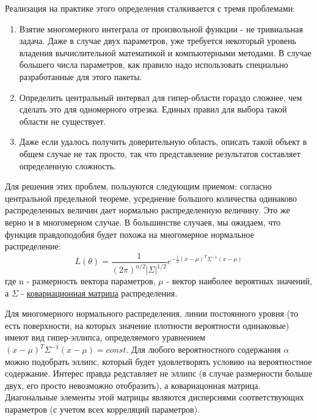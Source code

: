 Реализация на практике этого определения сталкивается с тремя
проблемами:

\begin{enumerate}
\item Взятие многомерного интеграла от произвольной функции - не тривиальная
  задача. Даже в случае двух параметров, уже требуется некоторый уровень
  владения вычислительной математикой и компьютерными методами. В случае
  большего числа параметров, как правило надо использовать специально
  разработанные для этого пакеты.
\item Определить центральный интервал для гипер-области гораздо сложнее, чем
  сделать это для одномерного отрезка. Единых правил для выбора такой
  области не существует.
\item Даже если удалось получить доверительную область, описать такой объект
  в общем случае не так просто, так что представление результатов
  составляет определенную сложность.
\end{enumerate}

Для решения этих проблем, пользуются следующим приемом: согласно
центральной предельной теореме, усреднение большого количества одинаково
распределенных величин дает нормально распределенную величину. Это же
верно и в многомерном случае. В большинстве случаев, мы ожидаем, что
функция правдоподобия будет похожа на многомерное нормальное
распределение: \begin{equation}
    L(\theta) = \frac{1}{(2 \pi)^{n/2}\left|\Sigma\right|^{1/2}} e^{-\frac{1}{2} (x - \mu)^T \Sigma^{-1} (x - \mu)}
\end{equation} где n - размерность вектора параметров, $\mu$ - вектор
наиболее вероятных значений, а $\Sigma$ -
\href{https://ru.wikipedia.org/wiki/\%D0\%9A\%D0\%BE\%D0\%B2\%D0\%B0\%D1\%80\%D0\%B8\%D0\%B0\%D1\%86\%D0\%B8\%D0\%BE\%D0\%BD\%D0\%BD\%D0\%B0\%D1\%8F_\%D0\%BC\%D0\%B0\%D1\%82\%D1\%80\%D0\%B8\%D1\%86\%D0\%B0}{ковариационная
матрица} распределения.

Для многомерного нормального распределения, линии постоянного уровня (то
есть поверхности, на которых значение плотности вероятности одинаковые)
имеют вид гипер-эллипса, определяемого уравнением
$(x - \mu)^T \Sigma^{-1} (x - \mu) = const$. Для любого вероятностного
содержания $\alpha$ можно подобрать эллипс, который будет
удовлетворять условию на вероятностное содержание. Интерес правда
редставляет не эллипс (в случае размерности больше двух, его просто
невозможно отобразить), а ковариацонная матрица. Диагональные элементы
этой матрицы являются дисперсиями соответствующих параметров (с учетом
всех корреляций параметров).

